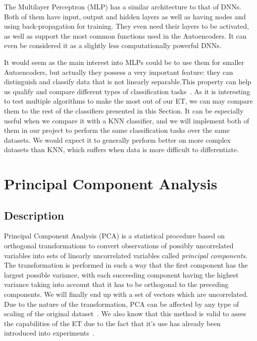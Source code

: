 The Multilayer Perceptron (MLP) has a similar architecture to that of DNNs. Both of them have input, output and hidden layers as well as having nodes and using back-propagation for training. They even need their layers to be activated, as well as support the most common functions used in the Autoencoders. It can even be considered it as a slightly less computationally powerful DNNs. \par

It would seem as the main interest into MLPs could be to use them for smaller Autoencoders, but actually they possess a very important feature: they  can distinguish and classify data that is not linearly separable.This property can help us qualify and compare different types of classification tasks~\cite{MLP_classifier}. As it is interesting to test multiple algorithms to make the most out of our ET, we can may compare them  to the rest of the classifiers presented in this Section. It can be especially useful when we compare it with a  KNN classifier, and we will implement both of them in our project to perform the same classification tasks over the same datasets. We would expect it to generally perform better on more complex datasets than KNN, which suffers when data is more difficult to differentiate. \par

\section{Principal Component Analysis}

\subsection{Description}
Principal Component Analysis (PCA) is a statistical procedure based on orthogonal transformations to convert observations of possibly uncorrelated variables into sets of linearly uncorrelated variables called \emph{principal components}. The transformation is performed in such a way that the first component has the largest possible variance, with each succeeding component having the highest variance taking into account that it has to be orthogonal to the preceding components. We will finally end up with a set of vectors which are uncorrelated. Due to the nature of the transformation, PCA can be affected by any type of scaling of the original dataset~\cite{mur:12}. 
%
We also know that this method is valid to asses the capabilities of the ET due to the fact that it's use has already been introduced into experiments~\cite{val:pel:18c}.

